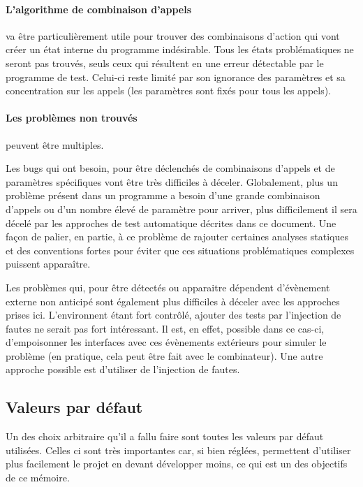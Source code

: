 \documentclass[a4paper]{report}
\begin{document}
\paragraph{L'algorithme de combinaison d'appels} va être particulièrement utile pour trouver des combinaisons d'action qui vont créer un état interne du programme indésirable.
Tous les états problématiques ne seront pas trouvés, seuls ceux qui résultent en une erreur détectable par le programme de test.
Celui-ci reste limité par son ignorance des paramètres et sa concentration sur les appels (les paramètres sont fixés pour tous les appels).

\paragraph{Les problèmes non trouvés} peuvent être multiples.

Les bugs qui ont besoin, pour être déclenchés de combinaisons d'appels et de paramètres spécifiques vont être très difficiles à déceler.
Globalement, plus un problème présent dans un programme a besoin d'une grande combinaison d'appels ou d'un nombre élevé de paramètre pour arriver, plus difficilement il sera décelé par les approches de test automatique décrites dans ce document.
Une façon de palier, en partie, à ce problème de rajouter certaines analyses statiques et des conventions fortes pour éviter que ces situations problématiques complexes puissent apparaître.

Les problèmes qui, pour être détectés ou apparaitre dépendent d'évènement externe non anticipé sont également plus difficiles à déceler avec les approches prises ici.
L'environnent étant fort contrôlé, ajouter des tests par l'injection de fautes ne serait pas fort intéressant.
Il est, en effet, possible dans ce cas-ci, d'empoisonner les interfaces avec ces évènements extérieurs pour simuler le problème (en pratique, cela peut être fait avec le combinateur).
Une autre approche possible est d'utiliser de l'injection de fautes.

\subsection{Valeurs par défaut}
Un des choix arbitraire qu'il a fallu faire sont toutes les valeurs par défaut utilisées.
Celles ci sont très importantes car, si bien réglées, permettent d'utiliser plus facilement le projet en devant développer moins, ce qui est un des objectifs de ce mémoire.
\end{document}
